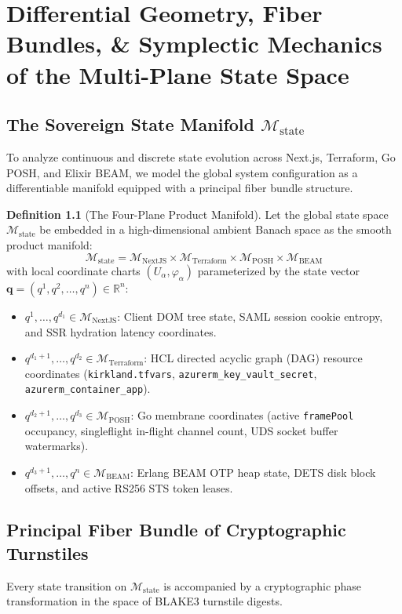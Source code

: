 \documentclass[10pt,twoside,openany]{book}
\theoremstyle{plain}
\theoremstyle{definition}
\newtheorem{definition}[theorem]{Definition}
\theoremstyle{remark}
\newcommand{\Man}{\mathcal{M}}
\newcommand{\R}{\mathbb{R}}
\begin{document}
\chapter{Differential Geometry, Fiber Bundles, \& Symplectic Mechanics of the Multi-Plane State Space}

\section{The Sovereign State Manifold $\Man_{\mathrm{state}}$}
To analyze continuous and discrete state evolution across Next.js, Terraform, Go POSH, and Elixir BEAM, we model the global system configuration as a differentiable manifold equipped with a principal fiber bundle structure.

\begin{definition}[The Four-Plane Product Manifold]
Let the global state space $\Man_{\mathrm{state}}$ be embedded in a high-dimensional ambient Banach space as the smooth product manifold:
\begin{equation}
\Man_{\mathrm{state}} = \Man_{\mathrm{NextJS}} \times \Man_{\mathrm{Terraform}} \times \Man_{\mathrm{POSH}} \times \Man_{\mathrm{BEAM}}
\end{equation}
with local coordinate charts $(U_\alpha, \varphi_\alpha)$ parameterized by the state vector $\mathbf{q} = (q^1, q^2, \dots, q^n) \in \R^n$:
\begin{itemize}
    \item $q^1, \dots, q^{d_1} \in \Man_{\mathrm{NextJS}}$: Client DOM tree state, SAML session cookie entropy, and SSR hydration latency coordinates.
    \item $q^{d_1+1}, \dots, q^{d_2} \in \Man_{\mathrm{Terraform}}$: HCL directed acyclic graph (DAG) resource coordinates (\texttt{kirkland.tfvars}, \texttt{azurerm\_key\_vault\_secret}, \texttt{azurerm\_container\_app}).
    \item $q^{d_2+1}, \dots, q^{d_3} \in \Man_{\mathrm{POSH}}$: Go membrane coordinates (active \texttt{framePool} occupancy, singleflight in-flight channel count, UDS socket buffer watermarks).
    \item $q^{d_3+1}, \dots, q^n \in \Man_{\mathrm{BEAM}}$: Erlang BEAM OTP heap state, DETS disk block offsets, and active RS256 STS token leases.
\end{itemize}
\end{definition}

\section{Principal Fiber Bundle of Cryptographic Turnstiles}
Every state transition on $\Man_{\mathrm{state}}$ is accompanied by a cryptographic phase transformation in the space of BLAKE3 turnstile digests.
\end{document}
